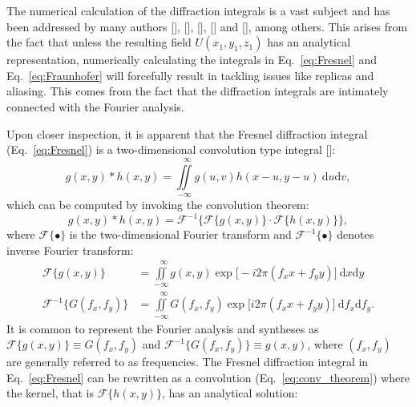 \begin{refsection}
The numerical calculation of the diffraction integrals is a vast subject and has been addressed by many authors [\cite{DArcio:94}], [\cite{Kelly2014}], [\cite[\textit{§5}]{Goodman2017}], [\cite{Buitrago-Duque:19}] and [\cite{Chubar2019}], among others. This arises from the fact that unless the resulting field $U(x_1,y_1,z_1)$ has an analytical representation, numerically calculating the integrals in Eq.~\ref{eq:Fresnel} and Eq.~\ref{eq:Fraunhofer} will forcefully result in tackling issues like replicas and aliasing. This comes from the fact that the diffraction integrals are intimately connected with the Fourier analysis. 

Upon closer inspection, it is apparent that the Fresnel diffraction integral (Eq.~\ref{eq:Fresnel}) is a two-dimensional convolution type integral [\cite[\textit{§2.1}]{Goodman2017}]:
\begin{equation}\label{eq:conv}
    g(x,y) * h(x,y) = \iint\limits_{-\infty}^{\hspace{8pt}\infty}{g(u,v)h(x-u,y-u)~\mathrm{d}u\mathrm{d}v},
\end{equation}{}
which can be computed by invoking the convolution theorem:
\begin{equation}\label{eq:conv_theorem}
    g(x,y) * h(x,y) = \mathcal{F}^{-1}\big\{\mathcal{F}\{g(x,y)\}\cdot\mathcal{F}\{h(x,y)\}\big\},
\end{equation}{}
where $\mathcal{F}\{\bullet\}$ is the two-dimensional Fourier transform and $\mathcal{F}^{-1}\{\bullet\}$ denotes inverse Fourier transform:
\begin{subequations}\label{eq:Fourier}
    \begin{align}
        \mathcal{F}\{g(x,y)\} &= \iint\limits_{-\infty}^{\hspace{8pt}\infty}{g(x,y)\exp{\big[-i2\pi(f_xx+f_yy)\big]}~\mathrm{d}x\mathrm{d}y}\\
        \mathcal{F}^{-1}\{G(f_x,f_y)\} &=\iint\limits_{-\infty}^{\hspace{8pt}\infty}{G(f_x,f_y)\exp{\big[i2\pi(f_xx+f_yy)\big]}~\mathrm{d}f_x\mathrm{d}f_y}.
    \end{align}
\end{subequations}{}
It is common to represent the Fourier analysis and syntheses as $\mathcal{F}\{g(x,y)\}\equiv G(f_x,f_y)$ and $\mathcal{F}^{-1}\{G(f_x,f_y)\}\equiv g(x,y)$, where $(f_x,f_y)$ are generally referred to as frequencies. The Fresnel diffraction integral in Eq.~\ref{eq:Fresnel} can be rewritten as a convolution (Eq.~\ref{eq:conv_theorem}) where the kernel, that is $\mathcal{F}\{h(x,y)\}$, has an analytical solution:

\end{refsection}
